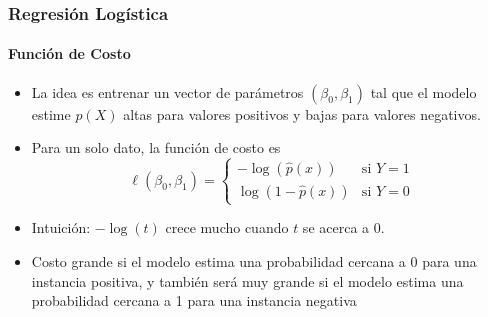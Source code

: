 \documentclass{beamer}
\begin{document}






\begin{frame}
\frametitle{Regresión Logística}
\framesubtitle{Función de Costo}
\begin{itemize}
	\item La idea es entrenar un vector de parámetros $( \beta_{0}, \beta_{1})$ tal que el modelo estime $p(X)$ altas para valores positivos y bajas para valores negativos. 
	\item Para un solo dato, la función de costo es 
		 \begin{equation}
		 	\ell(\beta_{0}, \beta_{1}) = 
		 		\begin{cases} 
		 			-\log(\hat{p}(x)) & \text{si } Y = 1 \\
		 			\log(1-\hat{p}(x))  & \text{si } Y = 0
		 		\end{cases} 
		 \end{equation}
	
	\item Intuición: $-\log(t)$ crece mucho cuando $t$ se acerca a 0.
	\item Costo grande si el modelo estima una probabilidad cercana a 0 para una instancia positiva, y también será muy grande si el modelo estima una probabilidad cercana a 1 para una instancia negativa
	\end{itemize}
\end{frame}
\end{document}
